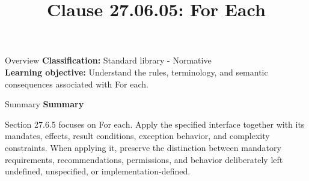 \documentclass[10pt,letterpaper]{article}
\title{Clause 27.06.05: For Each}
\author{}
\date{}
\begin{document}
\maketitle
\begin{CornellOverviewBox}{Overview}
\textbf{Classification:} Standard library - Normative\\[2pt]
\textbf{Learning objective:} Understand the rules, terminology, and semantic consequences associated with For each.
\end{CornellOverviewBox}\begin{CornellSummaryBox}{Summary}
{\sffamily\bfseries\color{Accent} Summary}\par\vspace{3pt}Section 27.6.5 focuses on For each. Apply the specified interface together with its mandates, effects, result conditions, exception behavior, and complexity constraints. When applying it, preserve the distinction between mandatory requirements, recommendations, permissions, and behavior deliberately left undefined, unspecified, or implementation-defined.
\end{CornellSummaryBox}
\end{document}
